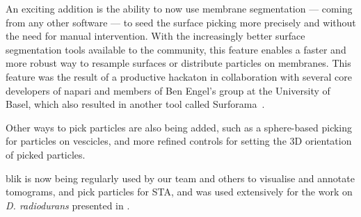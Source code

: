 An exciting addition is the ability to now use membrane segmentation --- coming from any other software --- to seed the surface picking more precisely and without the need for manual intervention.
With the increasingly better surface segmentation tools available to the community, this feature enables a faster and more robust way to resample surfaces or distribute particles on membranes.
This feature was the result of a productive hackaton in collaboration with several core developers of napari and members of Ben Engel's group at the University of Basel, which also resulted in another tool called Surforama~\cite{yamauchiSurforamaInteractiveExploration2024}.

Other ways to pick particles are also being added, such as a sphere-based picking for particles on vescicles, and more refined controls for setting the 3D orientation of picked particles.

blik is now being regularly used by our team and others to visualise and annotate tomograms, and pick particles for STA, and was used extensively for the work on \textit{D. radiodurans} presented in .
